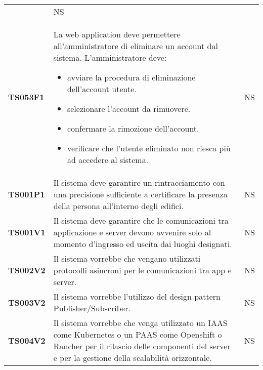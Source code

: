 \documentclass[../piano-di-qualifica.tex]{subfiles}
\begin{document}
\begin{centering}
\begin{longtable}[H]{>{\centering\bfseries}m{3cm} >{}p{10cm} >{\centering\arraybackslash}m{3cm}}
\begin{itemize}
                      \end{itemize}
                    & NS \\
        TS053F1     & La web application deve permettere all'amministratore di eliminare un account dal sistema. \newline
                      L'amministratore deve:
                      \begin{itemize}
                        \item avviare la procedura di eliminazione dell'account utente.
                        \item selezionare l'account da rimuovere.
                        \item confermare la rimozione dell'account.
                        \item verificare che l'utente eliminato non riesca più ad accedere al sistema.
                      \end{itemize}
                    & NS \\


        TS001P1 & Il sistema deve garantire un rintracciamento con una precisione sufficiente a certificare la presenza della persona all’interno degli edifici. \newline
                & NS \\

        TS001V1 & Il sistema deve garantire che le comunicazioni tra applicazione e server devono avvenire solo al momento d’ingresso ed uscita dai luoghi designati. \newline
                & NS \\

        TS002V2 & Il sistema vorrebbe che vengano utilizzati protocolli asincroni per le comunicazioni tra app e server. \newline
                & NS \\

        TS003V2 & Il sistema vorrebbe l’utilizzo del design pattern Publisher/Subscriber. \newline
                & NS \\

        TS004V2 & Il sistema vorrebbe che venga utilizzato un IAAS come Kubernetes o un PAAS come Openshift o Rancher per il rilascio delle componenti del server e per la gestione della scalabilità orizzontale. \newline
                & NS \\


\end{longtable}
\end{centering}
\end{document}
